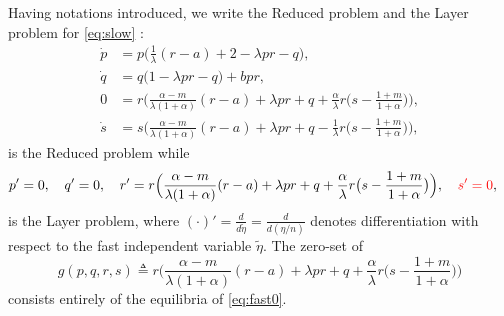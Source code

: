\documentclass[a4paper,11pt]{article}
\def\red{\color{red}}
\def\blue{\color{blue}}
\theoremstyle{remark}
\begin{document}
Having notations introduced, we write the Reduced problem and the Layer problem for \eqref{eq:slow} :
\begin{equation}\label{eq:slow0} \tag{R}
 \begin{aligned}
 \dot{p} &=p\Big(\frac{1}{\lambda}({r}-a) + 2- \lambda p {r} -q\Big),\\%
 \dot{q} &=q\Big(1 -\lambda p {r} -q\Big) + b p {r},\\%
 0&=r\Big(\frac{\alpha-m}{\lambda(1+\alpha)}(r-a) + \lambda pr + q +\frac{\alpha}{\lambda}r\big(s- \frac{1+m}{1+\alpha}\big)\Big),\\
 \dot{s} &=s\Big(\frac{\alpha-m}{\lambda(1+\alpha)}({r}-a) + \lambda p{r} + q - \frac{1}{\lambda}{r}\big(s- \frac{1+m}{1+\alpha}\big)\Big),%
 \end{aligned}
\end{equation}
is the Reduced problem while
\begin{equation} \label{eq:fast0} 
 \begin{aligned}
 {p}' &=0, \quad {q}' =0, \quad {r}' =r\Big(\frac{\alpha-m}{\lambda(1+\alpha)}(r-a) + \lambda pr + q +\frac{\alpha}{\lambda}r\big(s- \frac{1+m}{1+\alpha}\big)\Big), {\red  \quad{s}' =0 },
 \end{aligned}
\end{equation}
is the Layer problem, where $(\cdot)'= \frac{d}{d\tilde{\eta}} = \frac{d}{d(\eta/n)}$ denotes differentiation with respect to the fast independent variable $\tilde{\eta}$. The zero-set {\blue of}
\begin{equation}
g(p,q,r,s)\triangleq r\Big(\frac{\alpha-m}{\lambda(1+\alpha)}(r-a) + \lambda pr + q +\frac{\alpha}{\lambda}r\big(s- \frac{1+m}{1+\alpha}\big)\Big)\label{eq:zeroset} 
\end{equation}
consists entirely of the equilibria of \eqref{eq:fast0}. %
\end{document}
